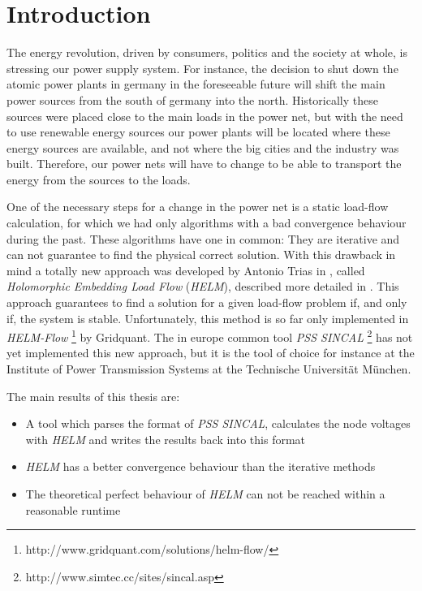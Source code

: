 \chapter{Introduction}
The energy revolution, driven by consumers, politics and the society at whole, is stressing our power supply system. For instance, the decision to shut down the atomic power plants in germany in the foreseeable future will shift the main power sources from the south of germany into the north. Historically these sources were placed close to the main loads in the power net, but with the need to use renewable energy sources our power plants will be located where these energy sources are available, and not where the big cities and the industry was built. Therefore, our power nets will have to change to be able to transport the energy from the sources to the loads.

One of the necessary steps for a change in the power net is a static load-flow calculation, for which we had only algorithms with a bad convergence behaviour during the past. These algorithms have one in common: They are iterative and can not guarantee to find the physical correct solution. With this drawback in mind a totally new approach was developed by Antonio Trias in \citep{helmIEEE}, called \emph{Holomorphic Embedding Load Flow} (\emph{HELM}), described more detailed in . This approach guarantees to find a solution for a given load-flow problem if, and only if, the system is stable. Unfortunately, this method is so far only implemented in \emph{HELM-Flow} \footnote{http://www.gridquant.com/solutions/helm-flow/} by Gridquant. The in europe common tool \emph{PSS SINCAL} \footnote{http://www.simtec.cc/sites/sincal.asp} has not yet implemented this new approach, but it is the tool of choice for instance at the Institute of Power Transmission Systems at the Technische Universität München. 

The main results of this thesis are:
\begin{itemize}
	\item A tool which parses the format of \emph{PSS SINCAL}, calculates the node voltages with \emph{HELM} and writes the results back into this format
	\item \emph{HELM} has a better convergence behaviour than the iterative methods
	\item The theoretical perfect behaviour of \emph{HELM} can not be reached within a reasonable runtime
\end{itemize}